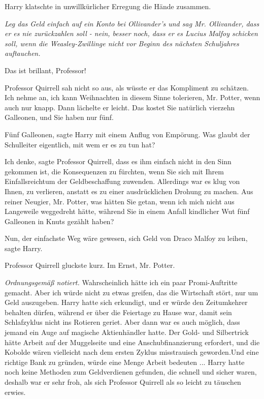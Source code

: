 Harry klatschte in unwillkürlicher Erregung die Hände zusammen.

\emph{Leg das Geld einfach auf ein Konto bei Ollivander's und sag Mr.
Ollivander, dass er es nie zurückzahlen soll - nein, besser noch, dass er es
Lucius Malfoy schicken soll, wenn die Weasley-Zwillinge nicht vor Beginn des
nächsten Schuljahres auftauchen.}

\glqq{}Das ist brillant, Professor!\grqq{}

Professor Quirrell sah nicht so aus, als wüsste er das Kompliment zu schätzen.
\glqq{}Ich nehme an, ich kann Weihnachten in diesem Sinne tolerieren, Mr. Potter,
wenn auch nur knapp.\grqq{} Dann lächelte er leicht. \glqq{}Das kostet Sie natürlich
vierzehn Galleonen, und Sie haben nur fünf.\grqq{}

\glqq{}Fünf Galleonen\grqq{}, sagte Harry mit einem Anflug von Empörung. \glqq{}
Was glaubt der Schulleiter eigentlich, mit wem er es zu tun hat?\grqq{}

\glqq{}Ich denke\grqq{}, sagte Professor Quirrell, \glqq{}dass es ihm einfach
nicht in den Sinn gekommen ist, die Konsequenzen zu fürchten, wenn Sie sich mit
Ihrem Einfallsreichtum der Geldbeschaffung zuwenden. Allerdings war es klug von
Ihnen, zu verlieren, anstatt es zu einer ausdrücklichen Drohung zu machen. Aus
reiner Neugier, Mr. Potter, was hätten Sie getan, wenn ich mich nicht aus
Langeweile weggedreht hätte, während Sie in einem Anfall kindlicher Wut fünf
Galleonen in Knuts gezählt haben?\grqq{}

\glqq{}Nun, der einfachste Weg wäre gewesen, sich Geld von Draco Malfoy zu
leihen\grqq{}, sagte Harry.

Professor Quirrell gluckste kurz. \glqq{}Im Ernst, Mr. Potter.\grqq{}

\emph{Ordnungsgemäß notiert.}
\glqq{}Wahrscheinlich hätte ich ein paar Promi-Auftritte gemacht. Aber ich würde
nicht zu etwas greifen, das die Wirtschaft stört, nur um Geld auszugeben.\grqq{} Harry
hatte sich erkundigt, und er würde den Zeitumkehrer behalten dürfen, während er
über die Feiertage zu Hause war, damit sein Schlafzyklus nicht ins Rotieren
geriet. Aber dann war es auch möglich, dass jemand ein Auge auf magische
Aktienhändler hatte. Der Gold- und Silbertrick hätte Arbeit auf der Muggelseite
und eine Anschubfinanzierung erfordert, und die Kobolde wären vielleicht nach
dem ersten Zyklus misstrauisch geworden.Und eine richtige Bank zu gründen, würde
eine Menge Arbeit bedeuten ... Harry hatte noch keine Methoden zum Geldverdienen
gefunden, die schnell und sicher waren, deshalb war er sehr froh, als sich
Professor Quirrell als so leicht zu täuschen erwies.

